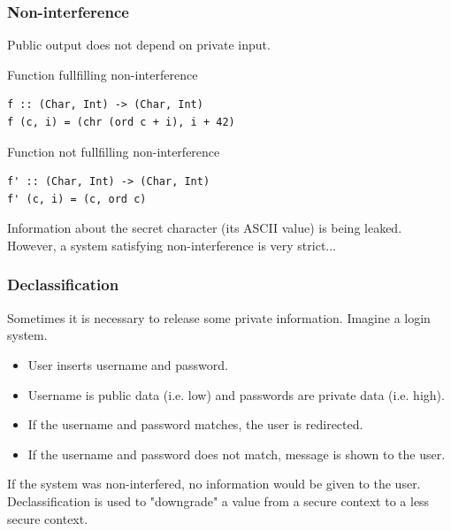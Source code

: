 \documentclass{beamer}
\begin{document}

\begin{frame}[fragile]
  \frametitle{Non-interference}
  Public output does not depend on private input. \pause

  \begin{block}{Function fullfilling non-interference}
\begin{verbatim}
f :: (Char, Int) -> (Char, Int)
f (c, i) = (chr (ord c + i), i + 42)
\end{verbatim}
  \end{block}
  \pause
  \begin{block}{Function not fullfilling non-interference}
\begin{verbatim}
f' :: (Char, Int) -> (Char, Int)
f' (c, i) = (c, ord c)
\end{verbatim}
  \end{block}
  \pause
  Information about the secret character (its ASCII value) is being leaked.
  \pause
  \newline
  However, a system satisfying non-interference is very strict...
\end{frame}


\begin{frame}
  \frametitle{Declassification}
  Sometimes it is necessary to release some private information.\pause
  \newline
  Imagine a login system. \pause
  \begin{itemize}
    \item User inserts username and password.
    \item Username is public data (i.e. low) and passwords are private data (i.e. high).
    \item If the username and password matches, the user is redirected.
    \item If the username and password does not match, message is shown to the user.
  \end{itemize}
  \pause
  If the system was non-interfered, no information would be given to the user.\pause
  \newline
  Declassification is used to "downgrade" a value from a secure context to a less secure context.
\end{frame}

\end{document}
